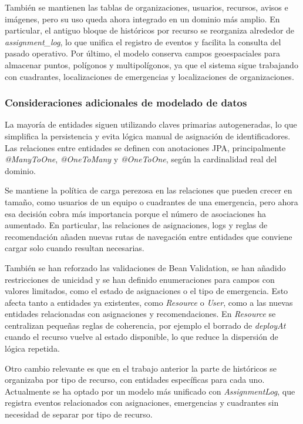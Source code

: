 También se mantienen las tablas de organizaciones, usuarios, recursos, avisos e imágenes, pero su uso queda ahora integrado en un dominio más amplio. En particular, el antiguo bloque de históricos por recurso se reorganiza alrededor de \textit{assignment\_log}, lo que unifica el registro de eventos y facilita la consulta del pasado operativo. Por último, el modelo conserva campos geoespaciales para almacenar puntos, polígonos y multipolígonos, ya que el sistema sigue trabajando con cuadrantes, localizaciones de emergencias y localizaciones de organizaciones.

\subsubsection{Consideraciones adicionales de modelado de datos}

La mayoría de entidades siguen utilizando claves primarias autogeneradas, lo que simplifica la persistencia y evita lógica manual de asignación de identificadores. Las relaciones entre entidades se definen con anotaciones JPA, principalmente \textit{@ManyToOne}, \textit{@OneToMany} y \textit{@OneToOne}, según la cardinalidad real del dominio.

Se mantiene la política de carga perezosa en las relaciones que pueden crecer en tamaño, como usuarios de un equipo o cuadrantes de una emergencia, pero ahora esa decisión cobra más importancia porque el número de asociaciones ha aumentado. En particular, las relaciones de asignaciones, logs y reglas de recomendación añaden nuevas rutas de navegación entre entidades que conviene cargar solo cuando resultan necesarias.

También se han reforzado las validaciones de Bean Validation, se han añadido restricciones de unicidad y se han definido enumeraciones para campos con valores limitados, como el estado de asignaciones o el tipo de emergencia. Esto afecta tanto a entidades ya existentes, como \textit{Resource} o \textit{User}, como a las nuevas entidades relacionadas con asignaciones y recomendaciones. En \textit{Resource} se centralizan pequeñas reglas de coherencia, por ejemplo el borrado de \textit{deployAt} cuando el recurso vuelve al estado disponible, lo que reduce la dispersión de lógica repetida.

Otro cambio relevante es que en el trabajo anterior la parte de históricos se organizaba por tipo de recurso, con entidades específicas para cada uno. Actualmente se ha optado por un modelo más unificado con \textit{AssignmentLog}, que registra eventos relacionados con asignaciones, emergencias y cuadrantes sin necesidad de separar por tipo de recurso.

